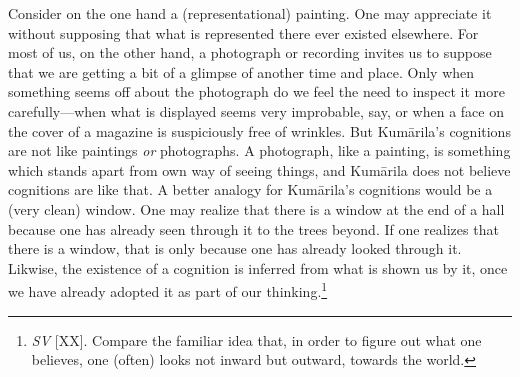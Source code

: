 \documentclass[11pt,letterpaper,oneside]{amsart}
\begin{document}
Consider on the one hand a (representational) painting. One may appreciate it without supposing that what is represented there ever existed elsewhere. For most of us, on the other hand, a photograph or recording invites us to suppose that we are getting a bit of a glimpse of another time and place. Only when something seems off about the photograph do we feel the need to inspect it more carefully---when what is displayed seems very improbable, say, or when a face on the cover of a magazine is suspiciously free of wrinkles. But Kum\=arila's cognitions are not like paintings \emph{or} photographs. A photograph, like a painting, is something which stands apart from own way of seeing things, and Kum\=arila does not believe cognitions are like that. A better analogy for Kum\=arila's cognitions would be a (very clean) window. One may realize that there is a window at the end of a hall because one has already seen through it to the trees beyond. If one realizes that there is a window, that is only because one has already looked through it. Likwise, the existence of a cognition is inferred from what is shown us by it, once we have already adopted it as part of our thinking.\footnote{\emph{SV} [XX]. Compare the familiar idea that, in order to figure out what one believes, one (often) looks not inward but outward, towards the world.}



\end{document}
